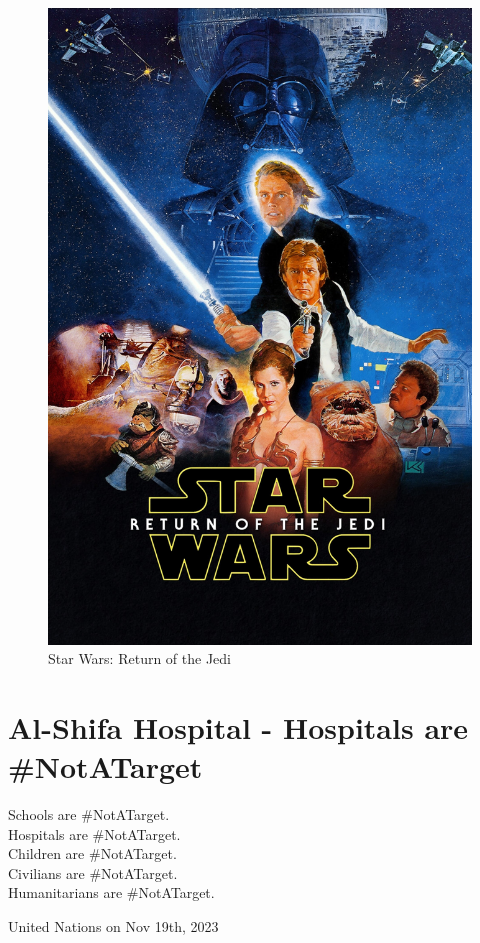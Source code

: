 \documentclass[16pt,openany,oneside]{book}
\begin{document}
\begin{figure}[H]
    \centering
    \includegraphics[width=0.5\linewidth]{assets/star_wars/return_of_the_jedi.jpg}
    \caption{Star Wars: Return of the Jedi}
    \label{fig:return-of-the-jedi-poster}
\end{figure}

\chapter{Al-Shifa Hospital - Hospitals are \#NotATarget}

\epigraph{
Schools are \#NotATarget.\\
Hospitals are \#NotATarget.\\
Children are \#NotATarget.\\
Civilians are \#NotATarget.\\
Humanitarians are \#NotATarget.
}{United Nations on Nov 19th, 2023 \cite{united2023target}}




\end{document}
